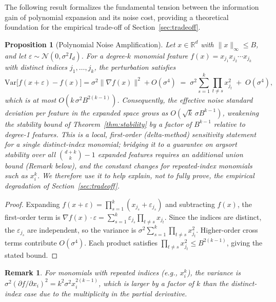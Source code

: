 \documentclass[12pt]{article}
\newcommand{\R}{\mathbb{R}}
\newtheorem{proposition}[theorem]{Proposition}
\newtheorem{remark}{Remark}
\begin{document}
The following result formalizes the fundamental tension between the information gain of polynomial expansion and its noise cost, providing a theoretical foundation for the empirical trade-off of Section~\ref{sec:tradeoff}.

\begin{proposition}[Polynomial Noise Amplification]
\label{prop:poly-noise}
Let $x \in \R^d$ with $\|x\|_\infty \leq B$, and let $\varepsilon \sim \mathcal{N}(0, \sigma^2 I_d)$. For a degree-$k$ monomial feature $f(x) = x_{j_1} x_{j_2} \cdots x_{j_k}$ with \emph{distinct} indices $j_1, \ldots, j_k$, the perturbation satisfies
\[
\mathrm{Var}\big[f(x+\varepsilon) - f(x)\big] = \sigma^2 \|\nabla f(x)\|^2 + O(\sigma^4) \;=\; \sigma^2 \sum_{s=1}^k \prod_{t \neq s} x_{j_t}^2 \;+\; O(\sigma^4),
\]
which is at most $O(k\, \sigma^2 B^{2(k-1)})$.
Consequently, the effective noise standard deviation per feature in the expanded space grows as $O(\sqrt{k}\, \sigma B^{k-1})$, weakening the stability bound of Theorem~\ref{thm:stability} by a factor of $B^{k-1}$ relative to degree-1 features. This is a \emph{local}, first-order (delta-method) sensitivity statement for a single distinct-index monomial; bridging it to a guarantee on argsort stability over all $\binom{d+k}{k}-1$ expanded features requires an additional union bound (Remark below), and the constant changes for repeated-index monomials such as $x_i^k$. We therefore use it to \emph{help explain}, not to fully prove, the empirical degradation of Section~\ref{sec:tradeoff}.
\end{proposition}

\begin{proof}
Expanding $f(x+\varepsilon) = \prod_{s=1}^k (x_{j_s} + \varepsilon_{j_s})$ and subtracting $f(x)$, the first-order term is $\nabla f(x) \cdot \varepsilon = \sum_{s=1}^k \varepsilon_{j_s} \prod_{t \neq s} x_{j_t}$. Since the indices are distinct, the $\varepsilon_{j_s}$ are independent, so the variance is $\sigma^2 \sum_{s=1}^k \prod_{t \neq s} x_{j_t}^2$. Higher-order cross terms contribute $O(\sigma^4)$. Each product satisfies $\prod_{t \neq s} x_{j_t}^2 \leq B^{2(k-1)}$, giving the stated bound.
\end{proof}

\begin{remark}
For monomials with repeated indices (e.g., $x_i^k$), the variance is $\sigma^2 (\partial f/\partial x_i)^2 = k^2 \sigma^2 x_i^{2(k-1)}$, which is larger by a factor of $k$ than the distinct-index case due to the multiplicity in the partial derivative.
\end{remark}
\end{document}
